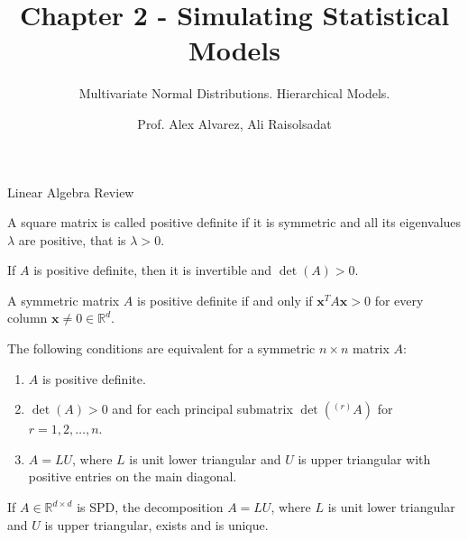 \documentclass[8pt]{beamer}
\title{Chapter 2 - Simulating Statistical Models}
\subtitle{Multivariate Normal Distributions. Hierarchical Models.}
\author{Prof. Alex Alvarez, Ali Raisolsadat}
\institute{School of Mathematical and Computational Sciences \\ University of Prince Edward Island}
\date{} %
\begin{document}
\maketitle

\begin{frame}{Linear Algebra Review}

\begin{definition}
A square matrix is called positive definite if it is symmetric and all its eigenvalues 
$\lambda$ are positive, that is $\lambda > 0$.
\end{definition}

\begin{theorem}
If $A$ is positive definite, then it is invertible and $\det(A) > 0$.
\end{theorem}

\begin{theorem}
A symmetric matrix $A$ is positive definite if and only if 
$\mathbf{x}^T A \mathbf{x} > 0$ for every column $\mathbf{x} \neq 0 \in \mathbb{R}^d$.
\end{theorem}

\begin{theorem}
The following conditions are equivalent for a symmetric $n \times n$ matrix $A$: 
\begin{enumerate}
\item $A$ is positive definite.
\item $\det(A) > 0$ and for each principal submatrix $\det({}^{(r)}A)$ for $r = 1, 2, \dots, n$.
\item $A = LU$, where $L$ is unit lower triangular and $U$ is upper triangular with positive entries on the main diagonal.
\end{enumerate}
\end{theorem}

\begin{theorem}
If $A \in \mathbb{R}^{d \times d}$ is SPD, the decomposition $A = LU$, where $L$ is unit lower triangular and $U$ is upper triangular, exists and is unique. 
\end{theorem}
\end{frame}
\end{document}
